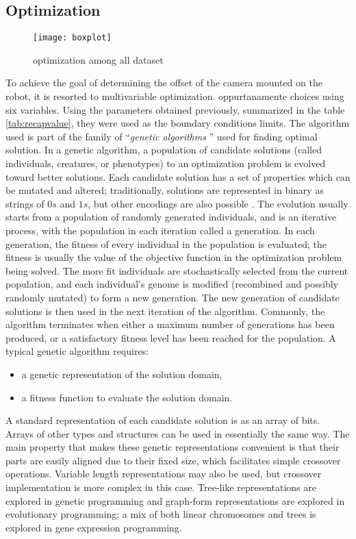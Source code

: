 \subsection{Optimization}
\begin{figure*}[htb]
\centering
\texttt{[image: boxplot]}
\caption{optimization among all dataset}
\label{fig:boxplot}
\end{figure*}
To achieve the goal of determining the offset of the camera mounted on the robot, it is resorted to multivariable optimization. oppurtanamente choices using six variables. Using the parameters obtained previously, summarized in the table \ref{tab:recapvalue}, they were used as the boundary conditions limits.
The algorithm used is part of the family of ``\emph{genetic algorithms} \cite{wiki:xxx}'' used for finding optimal solution.
In a genetic algorithm, a population of candidate solutions (called individuals, creatures, or phenotypes) to an optimization problem is evolved toward better solutions. Each candidate solution has a set of properties which can be mutated and altered; traditionally, solutions are represented in binary as strings of $0s$ and $1s$, but other encodings are also possible \cite{Whitley1994}.
The evolution usually starts from a population of randomly generated individuals, and is an iterative process, with the population in each iteration called a generation. In each generation, the fitness of every individual in the population is evaluated; the fitness is usually the value of the objective function in the optimization problem being solved. The more fit individuals are stochastically selected from the current population, and each individual's genome is modified (recombined and possibly randomly mutated) to form a new generation. The new generation of candidate solutions is then used in the next iteration of the algorithm. Commonly, the algorithm terminates when either a maximum number of generations has been produced, or a satisfactory fitness level has been reached for the population.
A typical genetic algorithm requires:
\begin{itemize}
\item a genetic representation of the solution domain,
\item a fitness function to evaluate the solution domain.
\end{itemize}
A standard representation of each candidate solution is as an array of bits\cite{Whitley1994}. Arrays of other types and structures can be used in essentially the same way. The main property that makes these genetic representations convenient is that their parts are easily aligned due to their fixed size, which facilitates simple crossover operations. Variable length representations may also be used, but crossover implementation is more complex in this case. Tree-like representations are explored in genetic programming and graph-form representations are explored in evolutionary programming; a mix of both linear chromosomes and trees is explored in gene expression programming.
